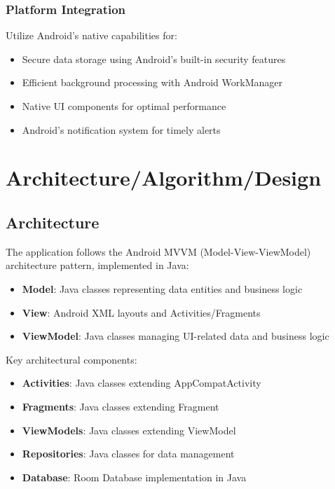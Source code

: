 \subsection{Platform Integration}
Utilize Android's native capabilities for:
\begin{itemize}
    \item Secure data storage using Android's built-in security features
    \item Efficient background processing with Android WorkManager
    \item Native UI components for optimal performance
    \item Android's notification system for timely alerts
\end{itemize}


\chapter{Architecture/Algorithm/Design}
\section{Architecture}
The application follows the Android MVVM (Model-View-ViewModel) architecture pattern, implemented in Java:

\begin{itemize}
    \item \textbf{Model}: Java classes representing data entities and business logic
    \item \textbf{View}: Android XML layouts and Activities/Fragments
    \item \textbf{ViewModel}: Java classes managing UI-related data and business logic
\end{itemize}

Key architectural components:
\begin{itemize}
    \item \textbf{Activities}: Java classes extending AppCompatActivity
    \item \textbf{Fragments}: Java classes extending Fragment
    \item \textbf{ViewModels}: Java classes extending ViewModel
    \item \textbf{Repositories}: Java classes for data management
    \item \textbf{Database}: Room Database implementation in Java
\end{itemize}

